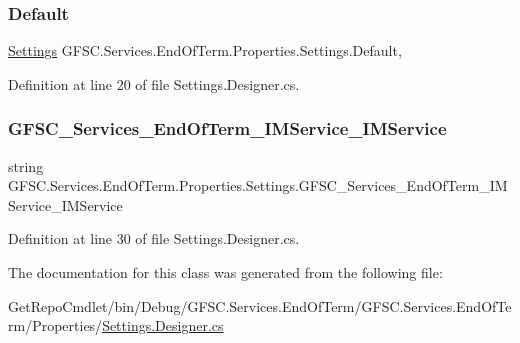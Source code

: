 \subsubsection{\texorpdfstring{Default}{Default}}
{\footnotesize\ttfamily \mbox{\hyperlink{class_g_f_s_c_1_1_services_1_1_end_of_term_1_1_properties_1_1_settings}{Settings}} G\+F\+S\+C.\+Services.\+End\+Of\+Term.\+Properties.\+Settings.\+Default\hspace{0.3cm}{\ttfamily [static]}, {\ttfamily [get]}}



Definition at line 20 of file Settings.\+Designer.\+cs.

\mbox{\label{class_g_f_s_c_1_1_services_1_1_end_of_term_1_1_properties_1_1_settings_ad741ee9474043185664f1648c6d0cb20}} 
\subsubsection{\texorpdfstring{G\+F\+S\+C\+\_\+\+Services\+\_\+\+End\+Of\+Term\+\_\+\+I\+M\+Service\+\_\+\+I\+M\+Service}{GFSC\_Services\_EndOfTerm\_IMService\_IMService}}
{\footnotesize\ttfamily string G\+F\+S\+C.\+Services.\+End\+Of\+Term.\+Properties.\+Settings.\+G\+F\+S\+C\+\_\+\+Services\+\_\+\+End\+Of\+Term\+\_\+\+I\+M\+Service\+\_\+\+I\+M\+Service\hspace{0.3cm}{\ttfamily [get]}}



Definition at line 30 of file Settings.\+Designer.\+cs.



The documentation for this class was generated from the following file\+:\begin{DoxyCompactItemize}
\item 
Get\+Repo\+Cmdlet/bin/\+Debug/\+G\+F\+S\+C.\+Services.\+End\+Of\+Term/\+G\+F\+S\+C.\+Services.\+End\+Of\+Term/\+Properties/\mbox{\hyperlink{_g_f_s_c_8_services_8_end_of_term_2_properties_2_settings_8_designer_8cs}{Settings.\+Designer.\+cs}}\end{DoxyCompactItemize}
